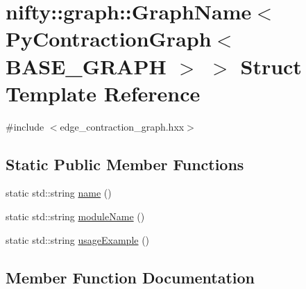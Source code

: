 \hypertarget{structnifty_1_1graph_1_1GraphName_3_01PyContractionGraph_3_01BASE__GRAPH_01_4_01_4}{}\section{nifty\+:\+:graph\+:\+:Graph\+Name$<$ Py\+Contraction\+Graph$<$ B\+A\+S\+E\+\_\+\+G\+R\+A\+P\+H $>$ $>$ Struct Template Reference}
\label{structnifty_1_1graph_1_1GraphName_3_01PyContractionGraph_3_01BASE__GRAPH_01_4_01_4}


{\ttfamily \#include $<$edge\+\_\+contraction\+\_\+graph.\+hxx$>$}

\subsection*{Static Public Member Functions}
\begin{DoxyCompactItemize}
\item 
static std\+::string \hyperlink{structnifty_1_1graph_1_1GraphName_3_01PyContractionGraph_3_01BASE__GRAPH_01_4_01_4_aeaaa5d12ae9dbe2ad7e1f69605fe9f84}{name} ()
\item 
static std\+::string \hyperlink{structnifty_1_1graph_1_1GraphName_3_01PyContractionGraph_3_01BASE__GRAPH_01_4_01_4_a318c414146fa3a5869e920842b511e3b}{module\+Name} ()
\item 
static std\+::string \hyperlink{structnifty_1_1graph_1_1GraphName_3_01PyContractionGraph_3_01BASE__GRAPH_01_4_01_4_ac8db233096e47d4733bc569a8634eed6}{usage\+Example} ()
\end{DoxyCompactItemize}


\subsection{Member Function Documentation}
\hypertarget{structnifty_1_1graph_1_1GraphName_3_01PyContractionGraph_3_01BASE__GRAPH_01_4_01_4_a318c414146fa3a5869e920842b511e3b}{}
